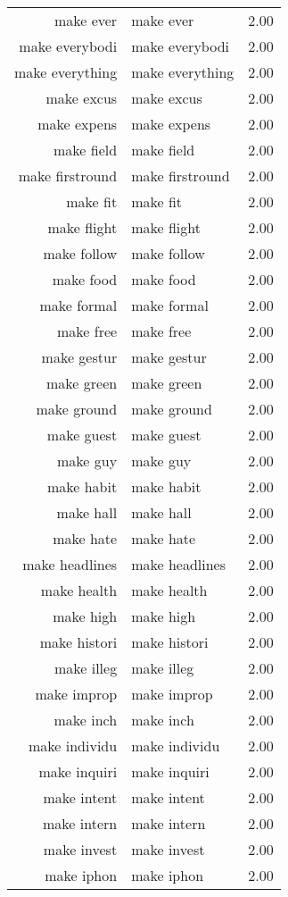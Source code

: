 \begin{table}[ht]
\begin{tabular}{rlr}
  make ever & make ever & 2.00 \\ 
  make everybodi & make everybodi & 2.00 \\ 
  make everything & make everything & 2.00 \\ 
  make excus & make excus & 2.00 \\ 
  make expens & make expens & 2.00 \\ 
  make field & make field & 2.00 \\ 
  make firstround & make firstround & 2.00 \\ 
  make fit & make fit & 2.00 \\ 
  make flight & make flight & 2.00 \\ 
  make follow & make follow & 2.00 \\ 
  make food & make food & 2.00 \\ 
  make formal & make formal & 2.00 \\ 
  make free & make free & 2.00 \\ 
  make gestur & make gestur & 2.00 \\ 
  make green & make green & 2.00 \\ 
  make ground & make ground & 2.00 \\ 
  make guest & make guest & 2.00 \\ 
  make guy & make guy & 2.00 \\ 
  make habit & make habit & 2.00 \\ 
  make hall & make hall & 2.00 \\ 
  make hate & make hate & 2.00 \\ 
  make headlines & make headlines & 2.00 \\ 
  make health & make health & 2.00 \\ 
  make high & make high & 2.00 \\ 
  make histori & make histori & 2.00 \\ 
  make illeg & make illeg & 2.00 \\ 
  make improp & make improp & 2.00 \\ 
  make inch & make inch & 2.00 \\ 
  make individu & make individu & 2.00 \\ 
  make inquiri & make inquiri & 2.00 \\ 
  make intent & make intent & 2.00 \\ 
  make intern & make intern & 2.00 \\ 
  make invest & make invest & 2.00 \\ 
  make iphon & make iphon & 2.00 \\ 

\end{tabular}
\end{table}
